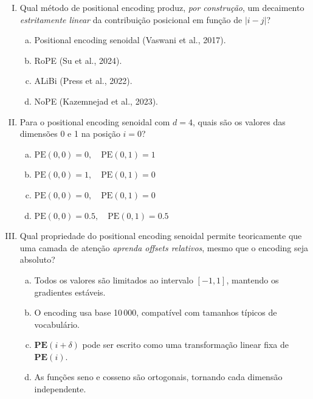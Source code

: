\documentclass{dlproblemset}
\begin{document}
\begin{enumerate}[I)]
\item Qual método de positional encoding produz, \emph{por construção}, um decaimento
      \emph{estritamente linear} da contribuição posicional em função de $|i - j|$?

\begin{enumerate}[a)]
    \item Positional encoding senoidal (Vaswani et al., 2017).
    \item RoPE (Su et al., 2024).
    \item ALiBi (Press et al., 2022).
    \item NoPE (Kazemnejad et al., 2023).
\end{enumerate}

\item Para o positional encoding senoidal com $d = 4$, quais são os valores das
      dimensões 0 e 1 na posição $i = 0$?

\begin{enumerate}[a)]
    \item $\mathrm{PE}(0,0) = 0,\quad \mathrm{PE}(0,1) = 1$
    \item $\mathrm{PE}(0,0) = 1,\quad \mathrm{PE}(0,1) = 0$
    \item $\mathrm{PE}(0,0) = 0,\quad \mathrm{PE}(0,1) = 0$
    \item $\mathrm{PE}(0,0) = 0.5,\quad \mathrm{PE}(0,1) = 0.5$
\end{enumerate}

\item Qual propriedade do positional encoding senoidal permite teoricamente que uma
      camada de atenção \emph{aprenda offsets relativos}, mesmo que o encoding seja absoluto?

\begin{enumerate}[a)]
    \item Todos os valores são limitados ao intervalo $[-1, 1]$, mantendo os gradientes estáveis.
    \item O encoding usa base 10\,000, compatível com tamanhos típicos de vocabulário.
    \item $\mathbf{PE}(i + \delta)$ pode ser escrito como uma transformação linear
          fixa de $\mathbf{PE}(i)$.
    \item As funções seno e cosseno são ortogonais, tornando cada dimensão independente.
\end{enumerate}


\end{enumerate}
\end{document}
